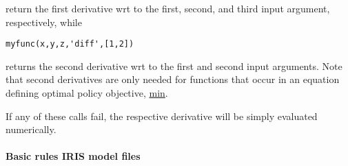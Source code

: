 return the first derivative wrt to the first, second, and third input
argument, respectively, while

\begin{verbatim}
myfunc(x,y,z,'diff',[1,2])
\end{verbatim}

returns the second derivative wrt to the first and second input
arguments. Note that second derivatives are only needed for functions
that occur in an equation defining optimal policy objective,
\href{modellang/min}{min}.

If any of these calls fail, the respective derivative will be simply
evaluated numerically.

\paragraph{Basic rules IRIS model
files}\label{basic-rules-iris-model-files}

